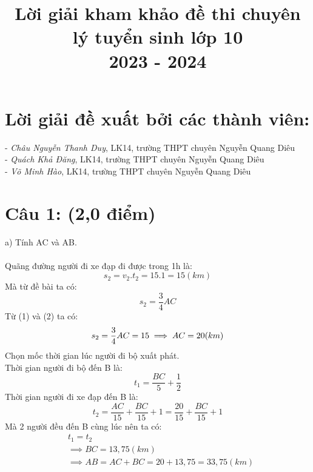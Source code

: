 \documentclass[50pt]{article}
\title{Lời giải kham khảo đề thi chuyên lý tuyển sinh lớp 10\\ 2023 - 2024}
\begin{document}
\maketitle

\section*{Lời giải đề xuất bởi các thành viên:}
- \textit{Châu Nguyễn Thanh Duy}, LK14, trường THPT chuyên Nguyễn Quang Diêu\\
- \textit{Quách Khả Đăng}, LK14, trường THPT chuyên Nguyễn Quang Diêu\\
- \textit{Võ Minh Hào}, LK14, trường THPT chuyên Nguyễn Quang Diêu\\
\hline
\section*{Câu 1: (2,0 điểm)}
a) Tính AC và AB.\\
\\
Quãng đường người đi xe đạp đi được trong 1h là:\\
\begin{equation}
    s_{2} = v_{2}.t_{2} = 15.1 = 15 (km)
\end{equation}
Mà từ đề bài ta có:\\
\begin{equation}
    s_{2} = \dfrac{3}{4}AC
\end{equation}
Từ (1) và (2) ta có:
\begin{equation*}
    s_{2} = \dfrac{3}{4}AC = 15 \\
    \implies AC = 20 (km)
\end{equation*}
Chọn mốc thời gian lúc người đi bộ xuất phát.\\
Thời gian người đi bộ đến B là:
\begin{equation*}
    t_{1} = \dfrac{BC}{5} + \dfrac{1}{2}
\end{equation*}
Thời gian người đi xe đạp đến B là:
\begin{equation*}
    t_{2} = \dfrac{AC}{15} + \dfrac{BC}{15} + 1 = \dfrac{20}{15} + \dfrac{BC}{15} + 1
\end{equation*}
Mà 2 người đều đến B cùng lúc nên ta có: \\
\begin{equation*}
    \begin{aligned}
        & t_{1} = t_{2} \\
        & \implies BC = 13,75 (km) \\
        & \implies AB = AC + BC = 20 + 13,75 = 33,75 (km)
    \end{aligned}
\end{equation*}
\end{document}
